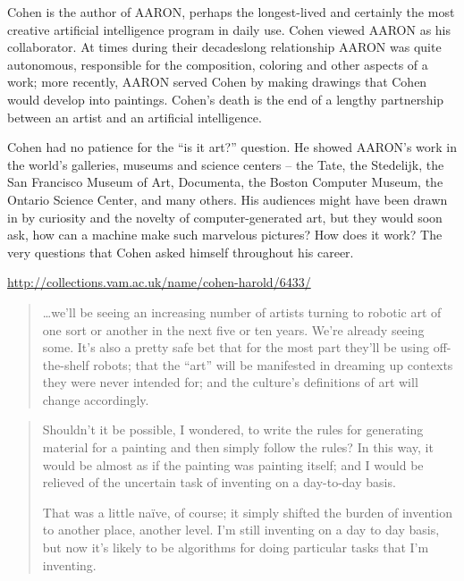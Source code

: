Cohen is the author of AARON, perhaps the longest-lived and certainly the most creative artificial intelligence program in daily use. Cohen viewed AARON as his collaborator. At times during their decadeslong relationship AARON was quite autonomous, responsible for the composition, coloring and other aspects of a work; more recently, AARON served Cohen by making drawings that Cohen would develop into paintings. Cohen's death is the end of a lengthy partnership between an artist and an artificial intelligence.\autocite{Cohen2016}

Cohen had no patience for the ``is it art?'' question. He showed AARON's work in the world's galleries, museums and science centers -- the Tate, the Stedelijk, the San Francisco Museum of Art, Documenta, the Boston Computer Museum, the Ontario Science Center, and many others. His audiences might have been drawn in by curiosity and the novelty of computer-generated art, but they would soon ask, how can a machine make such marvelous pictures? How does it work? The very questions that Cohen asked himself throughout his career.\autocite{Cohen2016}


\url{http://collections.vam.ac.uk/name/cohen-harold/6433/}

\begin{quotation}
  \ldots we'll be seeing an increasing number of artists turning to robotic art of one sort or another in the next five or ten years. We're already seeing some. It's also a pretty safe bet that for the most part they'll be using off-the-shelf robots; that the ``art'' will be manifested in dreaming up contexts they were never intended for; and the culture's definitions of art will change accordingly.
\end{quotation}

\begin{quotation}
  Shouldn't it be possible, I wondered, to write the rules for generating material for a painting and then simply follow the rules?  In this way, it would be almost as if the painting was painting itself; and I would be relieved of the uncertain task of inventing on a day-to-day basis. 

  That was a little naïve, of course; it simply shifted the burden of invention to another place, another level. I'm still inventing on a day to day basis, but now it's likely to be algorithms for doing particular tasks that I'm inventing.
\end{quotation}

